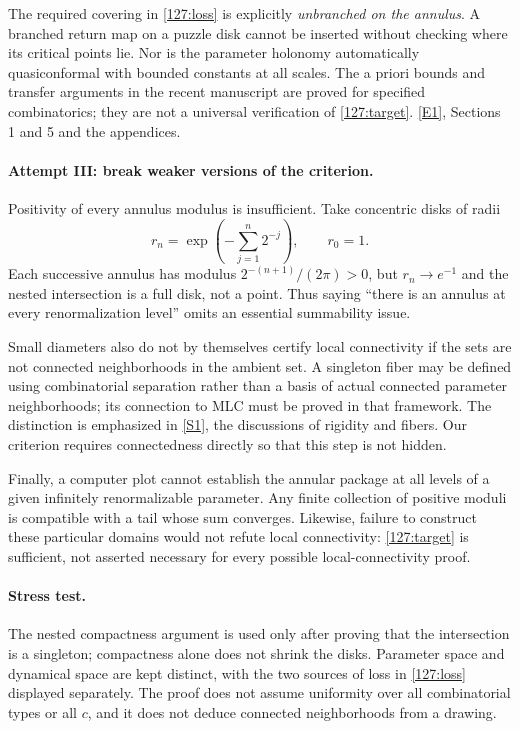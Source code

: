 \documentclass[11pt,a4paper]{article}
\newcommand{\sref}[2]{\hyperlink{source:#1:#2}{[S#2]}}
\newcommand{\eref}[2]{\hyperlink{extra:#1:#2}{[E#2]}}
\numberwithin{equation}{section}
\begin{document}
The required covering in \eqref{127:loss} is explicitly \emph{unbranched
on the annulus}.  A branched return map on a puzzle disk cannot be
inserted without checking where its critical points lie.  Nor is the
parameter holonomy automatically quasiconformal with bounded constants
at all scales.  The a priori bounds and transfer arguments in the
recent manuscript are proved for specified combinatorics; they are
not a universal verification of \eqref{127:target}.
\eref{127}{1}, Sections 1 and 5 and the appendices.

\paragraph{Attempt III: break weaker versions of the criterion.}
Positivity of every annulus modulus is insufficient.  Take concentric
disks of radii
\[
 r_n=\exp\!\left(-\sum_{j=1}^{n}2^{-j}\right),\qquad r_0=1.
\]
Each successive annulus has modulus $2^{-(n+1)}/(2\pi)>0$, but
$r_n\to e^{-1}$ and the nested intersection is a full disk, not a
point.  Thus saying ``there is an annulus at every renormalization
level'' omits an essential summability issue.

Small diameters also do not by themselves certify local connectivity
if the sets are not connected neighborhoods in the ambient set.
A singleton fiber may be defined using combinatorial separation rather
than a basis of actual connected parameter neighborhoods; its
connection to MLC must be proved in that framework.  The distinction
is emphasized in \sref{127}{1}, the discussions of rigidity and fibers.
Our criterion requires connectedness directly so that this step is
not hidden.

Finally, a computer plot cannot establish the annular package at all
levels of a given infinitely renormalizable parameter.  Any finite
collection of positive moduli is compatible with a tail whose sum
converges.  Likewise, failure to construct these particular domains
would not refute local connectivity: \eqref{127:target} is sufficient,
not asserted necessary for every possible local-connectivity proof.

\paragraph{Stress test.}
The nested compactness argument is used only after proving that the
intersection is a singleton; compactness alone does not shrink the
disks.  Parameter space and dynamical space are kept distinct, with
the two sources of loss in \eqref{127:loss} displayed separately.
The proof does not assume uniformity over all combinatorial types or
all $c$, and it does not deduce connected neighborhoods from a drawing.
\end{document}
